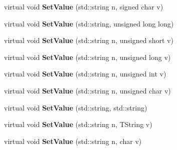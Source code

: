 \begin{DoxyCompactItemize}
\item 
\hypertarget{class_h_a_l_1_1_analysis_data_ae7c767472142f6ad5e51a0907b97cc43}{virtual void {\bfseries Set\-Value} (std\-::string n, signed char v)}\label{class_h_a_l_1_1_analysis_data_ae7c767472142f6ad5e51a0907b97cc43}

\item 
\hypertarget{class_h_a_l_1_1_analysis_data_afb6ab31a5d3b2ea315236a95d591d394}{virtual void {\bfseries Set\-Value} (std\-::string, unsigned long long)}\label{class_h_a_l_1_1_analysis_data_afb6ab31a5d3b2ea315236a95d591d394}

\item 
\hypertarget{class_h_a_l_1_1_analysis_data_abf5e489200156f56b099c20f131b9900}{virtual void {\bfseries Set\-Value} (std\-::string n, unsigned short v)}\label{class_h_a_l_1_1_analysis_data_abf5e489200156f56b099c20f131b9900}

\item 
\hypertarget{class_h_a_l_1_1_analysis_data_a6109a17a1f20826ea8b298f86923ea0d}{virtual void {\bfseries Set\-Value} (std\-::string n, unsigned long v)}\label{class_h_a_l_1_1_analysis_data_a6109a17a1f20826ea8b298f86923ea0d}

\item 
\hypertarget{class_h_a_l_1_1_analysis_data_a1bb82be5b2f6bb3ecdd4c188240a73b1}{virtual void {\bfseries Set\-Value} (std\-::string n, unsigned int v)}\label{class_h_a_l_1_1_analysis_data_a1bb82be5b2f6bb3ecdd4c188240a73b1}

\item 
\hypertarget{class_h_a_l_1_1_analysis_data_aea9503293455f0cb0b45c406dd974f5c}{virtual void {\bfseries Set\-Value} (std\-::string n, unsigned char v)}\label{class_h_a_l_1_1_analysis_data_aea9503293455f0cb0b45c406dd974f5c}

\item 
\hypertarget{class_h_a_l_1_1_analysis_data_a08e07a5913066328f8a7e66da1a3ab15}{virtual void {\bfseries Set\-Value} (std\-::string, std\-::string)}\label{class_h_a_l_1_1_analysis_data_a08e07a5913066328f8a7e66da1a3ab15}

\item 
\hypertarget{class_h_a_l_1_1_analysis_data_afb08f8a9d7a8b169d77a0345dd776d69}{virtual void {\bfseries Set\-Value} (std\-::string n, T\-String v)}\label{class_h_a_l_1_1_analysis_data_afb08f8a9d7a8b169d77a0345dd776d69}

\item 
\hypertarget{class_h_a_l_1_1_analysis_data_a8dbbbd09cd31ead01d3b2f5f99fd4bc0}{virtual void {\bfseries Set\-Value} (std\-::string n, char v)}\label{class_h_a_l_1_1_analysis_data_a8dbbbd09cd31ead01d3b2f5f99fd4bc0}


\end{DoxyCompactItemize}
